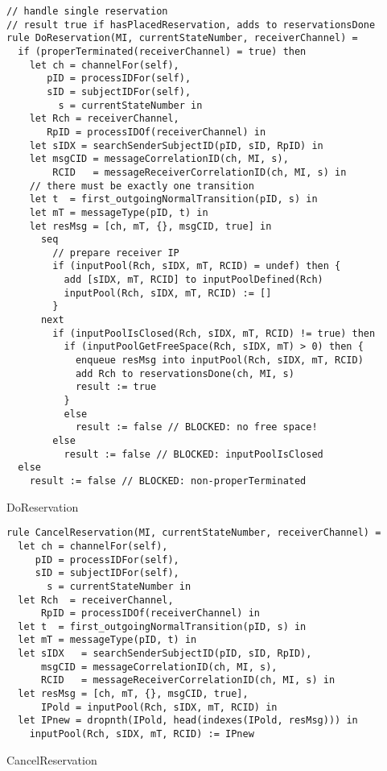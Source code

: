 \begin{listing}[H]
\begin{verbatim}
// handle single reservation
// result true if hasPlacedReservation, adds to reservationsDone
rule DoReservation(MI, currentStateNumber, receiverChannel) =
  if (properTerminated(receiverChannel) = true) then
    let ch = channelFor(self),
       pID = processIDFor(self),
       sID = subjectIDFor(self),
         s = currentStateNumber in
    let Rch = receiverChannel,
       RpID = processIDOf(receiverChannel) in
    let sIDX = searchSenderSubjectID(pID, sID, RpID) in
    let msgCID = messageCorrelationID(ch, MI, s),
        RCID   = messageReceiverCorrelationID(ch, MI, s) in
    // there must be exactly one transition
    let t  = first_outgoingNormalTransition(pID, s) in
    let mT = messageType(pID, t) in
    let resMsg = [ch, mT, {}, msgCID, true] in
      seq
        // prepare receiver IP
        if (inputPool(Rch, sIDX, mT, RCID) = undef) then {
          add [sIDX, mT, RCID] to inputPoolDefined(Rch)
          inputPool(Rch, sIDX, mT, RCID) := []
        }
      next
        if (inputPoolIsClosed(Rch, sIDX, mT, RCID) != true) then
          if (inputPoolGetFreeSpace(Rch, sIDX, mT) > 0) then {
            enqueue resMsg into inputPool(Rch, sIDX, mT, RCID)
            add Rch to reservationsDone(ch, MI, s)
            result := true
          }
          else
            result := false // BLOCKED: no free space!
        else
          result := false // BLOCKED: inputPoolIsClosed
  else
    result := false // BLOCKED: non-properTerminated
\end{verbatim}
\caption{DoReservation}
\label{lst:asm:DoReservation}
\end{listing}




\begin{listing}[H]
\begin{verbatim}
rule CancelReservation(MI, currentStateNumber, receiverChannel) =
  let ch = channelFor(self),
     pID = processIDFor(self),
     sID = subjectIDFor(self),
       s = currentStateNumber in
  let Rch  = receiverChannel,
      RpID = processIDOf(receiverChannel) in
  let t  = first_outgoingNormalTransition(pID, s) in
  let mT = messageType(pID, t) in
  let sIDX   = searchSenderSubjectID(pID, sID, RpID),
      msgCID = messageCorrelationID(ch, MI, s),
      RCID   = messageReceiverCorrelationID(ch, MI, s) in
  let resMsg = [ch, mT, {}, msgCID, true],
      IPold = inputPool(Rch, sIDX, mT, RCID) in
  let IPnew = dropnth(IPold, head(indexes(IPold, resMsg))) in
    inputPool(Rch, sIDX, mT, RCID) := IPnew
\end{verbatim}
\caption{CancelReservation}
\label{lst:asm:CancelReservation}
\end{listing}




